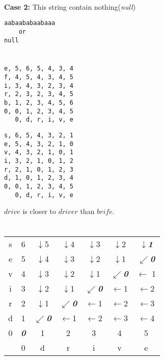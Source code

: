\documentclass{article}
\begin{document}
    \paragraph{}
    \textbf{Case 2:}
    This string contain nothing(\emph{null})
    \begin{verbatim}
aabaababaabaaa
    or
null
    \end{verbatim}
    \section{}
    \begin{verbatim}
e, 5, 6, 5, 4, 3, 4 
f, 4, 5, 4, 3, 4, 5
i, 3, 4, 3, 2, 3, 4
r, 2, 3, 2, 3, 4, 5
b, 1, 2, 3, 4, 5, 6   
0, 0, 1, 2, 3, 4, 5
   0, d, r, i, v, e  
    \end{verbatim}
    \begin{verbatim}
s, 6, 5, 4, 3, 2, 1
e, 5, 4, 3, 2, 1, 0
v, 4, 3, 2, 1, 0, 1
i, 3, 2, 1, 0, 1, 2
r, 2, 1, 0, 1, 2, 3
d, 1, 0, 1, 2, 3, 4
0, 0, 1, 2, 3, 4, 5
   0, d, r, i, v, e
    \end{verbatim}
    $drive$ is closer to $driver$ than $brife$. 
\section{}
    \begin{tabular}{ccccccc}
s& 6& $\downarrow$5& $\downarrow$4& $\downarrow$3& $\downarrow$2& \emph{\textbf{$\downarrow$1}}\\
e& 5& $\downarrow$4& $\downarrow$3& $\downarrow$2& $\downarrow$1& \emph{\textbf{$\swarrow$0}}\\
v& 4& $\downarrow$3& $\downarrow$2& $\downarrow$1& \emph{\textbf{$\swarrow$0}}&$\leftarrow$ 1\\
i& 3& $\downarrow$2& $\downarrow$1& \emph{\textbf{$\swarrow$0}}& $\leftarrow$1& $\leftarrow$2\\
r& 2& $\downarrow$1& \emph{\textbf{$\swarrow$0}}& $\leftarrow$1& $\leftarrow$2& $\leftarrow$3\\
d& 1& \emph{\textbf{$\swarrow$0}}& $\leftarrow$1& $\leftarrow$2& $\leftarrow$3& $\leftarrow$4\\
0& \emph{\textbf{0}}& 1& 2& 3& 4& 5\\
 & 0& d& r& i& v& e\\
    \end{tabular}
    \section{}
\end{document}

